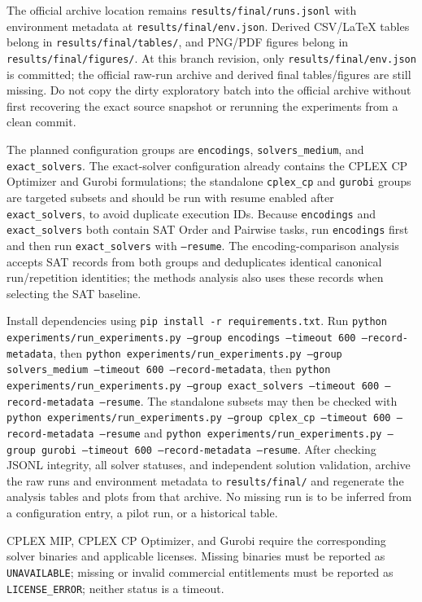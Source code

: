 \documentclass[a4paper,fleqn]{cas-sc}
\begin{document}
The official archive location remains \texttt{results/final/runs.jsonl} with
environment metadata at \texttt{results/final/env.json}. Derived CSV/LaTeX tables
belong in \texttt{results/final/tables/}, and PNG/PDF figures belong in
\texttt{results/final/figures/}. At this branch revision, only
\texttt{results/final/env.json} is committed; the official raw-run archive and
derived final tables/figures are still missing. Do not copy the dirty exploratory
batch into the official archive without first recovering the exact source snapshot
or rerunning the experiments from a clean commit.

The planned configuration groups are \texttt{encodings},
\texttt{solvers\_medium}, and \texttt{exact\_solvers}. The exact-solver configuration
already contains the CPLEX CP Optimizer and Gurobi formulations; the standalone
\texttt{cplex\_cp} and \texttt{gurobi} groups are targeted subsets and should be run
with resume enabled after \texttt{exact\_solvers}, to avoid duplicate execution IDs.
Because \texttt{encodings} and \texttt{exact\_solvers} both contain SAT Order and
Pairwise tasks, run \texttt{encodings} first and then run \texttt{exact\_solvers}
with \texttt{--resume}. The encoding-comparison analysis accepts SAT records from
both groups and deduplicates identical canonical run/repetition identities; the
methods analysis also uses these records when selecting the SAT baseline.

Install dependencies using \texttt{pip install -r requirements.txt}. Run
\texttt{python experiments/run\_experiments.py --group encodings --timeout 600 --record-metadata},
then \texttt{python experiments/run\_experiments.py --group solvers\_medium --timeout 600 --record-metadata},
then \texttt{python experiments/run\_experiments.py --group exact\_solvers --timeout 600 --record-metadata --resume}.
The standalone subsets may then be checked with
\texttt{python experiments/run\_experiments.py --group cplex\_cp --timeout 600 --record-metadata --resume}
and
\texttt{python experiments/run\_experiments.py --group gurobi --timeout 600 --record-metadata --resume}.
After checking JSONL integrity, all solver statuses, and independent solution validation,
archive the raw runs and environment metadata to \texttt{results/final/} and regenerate
the analysis tables and plots from that archive. No missing run is to be inferred from
a configuration entry, a pilot run, or a historical table.

CPLEX MIP, CPLEX CP Optimizer, and Gurobi require the corresponding solver binaries
and applicable licenses. Missing binaries must be reported as \texttt{UNAVAILABLE};
missing or invalid commercial entitlements must be reported as \texttt{LICENSE\_ERROR};
neither status is a timeout.
\end{document}
